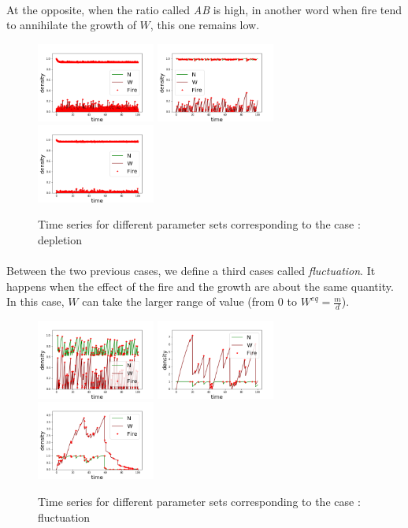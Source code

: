 \documentclass{article}
\begin{document}
\paragraph{}
At the opposite, when the ratio called \textit{AB} is high, in another word when fire tend to annihilate the growth of $W$, this one remains low. 
\begin{figure}[h!]
\centering
\includegraphics[width=3.9cm]{continue_1.png}
\includegraphics[width=3.9cm]{continue_2.png}
\includegraphics[width=3.9cm]{continue_3.png}
\caption{Time series for different parameter sets corresponding to the case : depletion}
\end{figure}


\paragraph{}
Between the two previous cases, we define a third cases called \textit{fluctuation}. It happens when the effect of the fire and the growth are about the same quantity. In this case, $W$ can take the larger range of value (from $0$ to $W^{eq}=\frac{m}{d}$).
\begin{figure}[h!]
\centering
\includegraphics[width=3.9cm]{middle_1.png}
\includegraphics[width=3.9cm]{middle_2.png}
\includegraphics[width=3.9cm]{middle_3.png}
\caption{Time series for different parameter sets corresponding to the case : fluctuation}
\end{figure}
\end{document}
